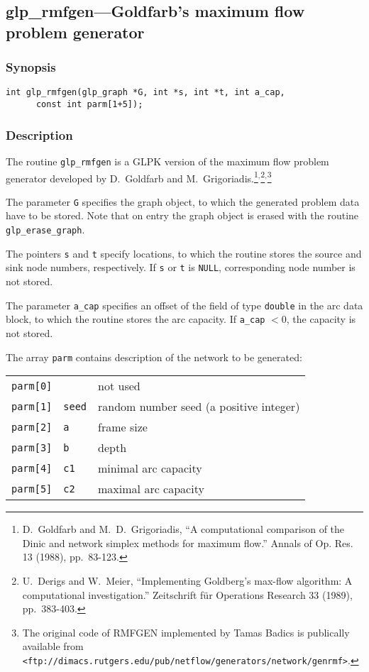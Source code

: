 \newpage

\subsection{glp\_rmfgen---Goldfarb's maximum flow problem generator}

\subsubsection*{Synopsis}

\begin{verbatim}
int glp_rmfgen(glp_graph *G, int *s, int *t, int a_cap,
      const int parm[1+5]);
\end{verbatim}

\subsubsection*{Description}

The routine \verb|glp_rmfgen| is a GLPK version of the maximum flow
problem generator developed by D.~Goldfarb and
M.~Grigoriadis.\footnote{D.~Goldfarb and M.~D.~Grigoriadis,
``A computational comparison of the Dinic and network simplex methods
for maximum flow.'' Annals of Op. Res. 13 (1988),
pp.~83-123.}$^{,}$\footnote{U.~Derigs and W.~Meier, ``Implementing
Goldberg's max-flow algorithm: A computational investigation.''
Zeitschrift f\"ur Operations Research 33 (1989),
pp.~383-403.}$^{,}$\footnote{The original code of RMFGEN implemented by
Tamas Badics is publically available from
{\tt <ftp://dimacs.rutgers.edu/pub/netflow/generators/network/genrmf>}.}

The parameter \verb|G| specifies the graph object, to which the
generated problem data have to be stored. Note that on entry the graph
object is erased with the routine \verb|glp_erase_graph|.

The pointers \verb|s| and \verb|t| specify locations, to which the
routine stores the source and sink node numbers, respectively. If
\verb|s| or \verb|t| is \verb|NULL|, corresponding node number is not
stored.

The parameter \verb|a_cap| specifies an offset of the field of type
\verb|double| in the arc data block, to which the routine stores the arc
capacity. If \verb|a_cap| $<0$, the capacity is not stored.

The array \verb|parm| contains description of the network to be
generated:

\begin{tabular}{@{}lll@{}}
\verb|parm[0]|&           &not used\\
\verb|parm[1]|&\verb|seed|&random number seed (a positive integer)\\
\verb|parm[2]|&\verb|a   |&frame size\\
\verb|parm[3]|&\verb|b   |&depth\\
\verb|parm[4]|&\verb|c1  |&minimal arc capacity\\
\verb|parm[5]|&\verb|c2  |&maximal arc capacity\\
\end{tabular}

